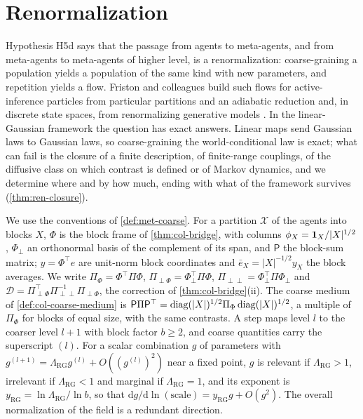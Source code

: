 \section{Renormalization}\label{sec:ren}

Hypothesis H5d says that the passage from agents to meta-agents, and from meta-agents to meta-agents of higher level, is a renormalization: coarse-graining a population yields a population of the same kind with new parameters, and repetition yields a flow. Friston and colleagues build such flows for active-inference particles from particular partitions and an adiabatic reduction \citep{friston2019free} and, in discrete state spaces, from renormalizing generative models \citep{friston2025pixels}. In the linear-Gaussian framework the question has exact answers. Linear maps send Gaussian laws to Gaussian laws, so coarse-graining the world-conditional law is exact; what can fail is the closure of a finite description, of finite-range couplings, of the diffusive class on which contrast is defined or of Markov dynamics, and we determine where and by how much, ending with what of the framework survives (\cref{thm:ren-closure}).

We use the conventions of \cref{def:met-coarse}. For a partition $\mathcal X$ of the agents into blocks $X$, $\Phi$ is the block frame of \cref{thm:col-bridge}, with columns $\phi_X=\mathbf{1}_X/\lvert X\rvert^{1/2}$, $\Phi_\perp$ an orthonormal basis of the complement of its span, and $\mathsf P$ the block-sum matrix; $y=\Phi^\top e$ are unit-norm block coordinates and $\bar e_X=\lvert X\rvert^{-1/2}y_X$ the block averages. We write $\Pi_\Phi=\Phi^\top\Pi\Phi$, $\Pi_{\perp\Phi}=\Phi_\perp^\top\Pi\Phi$, $\Pi_{\perp\perp}=\Phi_\perp^\top\Pi\Phi_\perp$ and $\mathcal D=\Pi_{\perp\Phi}^\top\Pi_{\perp\perp}^{-1}\Pi_{\perp\Phi}$, the correction of \cref{thm:col-bridge}(ii). The coarse medium of \cref{def:col-coarse-medium} is $\mathsf P\Pi\mathsf P^\top=\operatorname{diag}(\lvert X\rvert)^{1/2}\Pi_\Phi\operatorname{diag}(\lvert X\rvert)^{1/2}$, a multiple of $\Pi_\Phi$ for blocks of equal size, with the same contrasts. A step maps level $l$ to the coarser level $l+1$ with block factor $b\ge2$, and coarse quantities carry the superscript $(l)$. For a scalar combination $g$ of parameters with $g^{(l+1)}=\Lambda_{\mathrm{RG}}g^{(l)}+O((g^{(l)})^2)$ near a fixed point, $g$ is relevant if $\Lambda_{\mathrm{RG}}>1$, irrelevant if $\Lambda_{\mathrm{RG}}<1$ and marginal if $\Lambda_{\mathrm{RG}}=1$, and its exponent is $y_{\mathrm{RG}}=\ln\Lambda_{\mathrm{RG}}/\ln b$, so that $\mathrm dg/\mathrm d\ln(\text{scale})=y_{\mathrm{RG}}g+O(g^2)$. The overall normalization of the field is a redundant direction.

